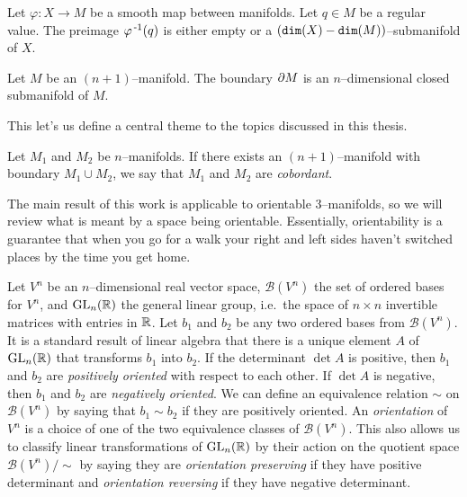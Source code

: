 \begin{theorem}
	Let $\varphi:X\to M$ be a smooth map between manifolds.
	Let $q\in M$ be a regular value.
	The preimage $\varphi^{\,\text{-}1}(q)$ is either empty or a $(\texttt{dim}(X)-\texttt{dim}(M))$--submanifold of $X$.
\end{theorem}

\begin{prop}
	\label{prop:boundariesaremanifolds}
	Let $M$ be an $(n+1)$--manifold.
	The boundary $\partial M$ is an $n$--dimensional closed submanifold of $M$.
\end{prop}

This let's us define a central theme to the topics discussed in this thesis.

\begin{defn}
  Let $M_1$ and $M_2$ be $n$--manifolds.
  If there exists an $(n+1)$--manifold with boundary $M_1\cup M_2$, we say that $M_1$ and $M_2$ are \emph{cobordant}.
\end{defn}

The main result of this work is applicable to orientable 3--manifolds, so we will review what is meant by a space being orientable.
Essentially, orientability is a guarantee that when you go for a walk your right and left sides haven't switched places by the time you get home.

\begin{defn}
	\label{def:orientation}
	Let $V^n$ be an $n$--dimensional real vector space, $\mathcal{B}(V^n)$ the set of ordered bases for $V^n$, and $\textrm{GL}_{n}(\mathbb{R})$ the general linear group, i.e.\ the space of $n\times n$ invertible matrices with entries in $\mathbb{R}$.
	Let $b_1$ and $b_2$ be any two ordered bases from $\mathcal{B}(V^n)$.
	It is a standard result of linear algebra that there is a unique element $A$ of $\textrm{GL}_{n}(\mathbb{R})$ that transforms $b_1$ into $b_2$.
	If the determinant $\det A$ is positive, then $b_1$ and $b_2$ are \emph{positively oriented} with respect to each other.
	If $\det A$ is negative, then $b_1$ and $b_2$ are \emph{negatively oriented}.
	We can define an equivalence relation $\sim$ on $\mathcal{B}(V^n)$ by saying that $b_1\sim b_2$ if they are positively oriented.
	An \emph{orientation} of $V^n$ is a choice of one of the two equivalence classes of $\mathcal{B}(V^n)$.
	This also allows us to classify linear transformations of $\textrm{GL}_{n}(\mathbb{R})$ by their action on the quotient space $\mathcal{B}(V^n)/\sim$ by saying they are \emph{orientation preserving} if they have positive determinant and \emph{orientation reversing} if they have negative determinant.
\end{defn}

